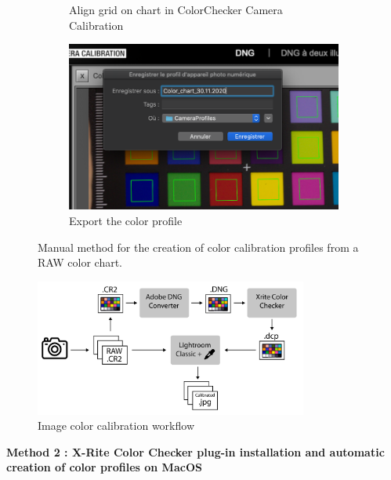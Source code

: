 \documentclass[10pt,letter,english]{article}
\begin{document}
\begin{figure}[H]
\begin{subfigure}[t]{.45\textwidth}
  \caption{Align grid on chart in ColorChecker Camera Calibration}
  \label{color_checker_camera_calibration}
\end{subfigure}%
\vspace{10pt}
\begin{subfigure}[t]{.45\textwidth}
  \centering
  \includegraphics[width=1\textwidth]{Figures/create profile.png}
  \caption{Export the color profile}
  \label{color_checker_profile}
\end{subfigure}
\caption{Manual method for the creation of color calibration profiles from a RAW color chart.}
\label{Manual method}
\end{figure}


\begin{figure}[H]
    \centering
    \includegraphics[width=0.8\textwidth]{Figures/manual_method.png}
    \caption{Image color calibration workflow}
    \label{fig:workflow}
\end{figure}



\bigskip
\noindent \textbf{Method 2 : X-Rite Color Checker plug-in installation and automatic creation of color profiles on MacOS}
\end{document}
